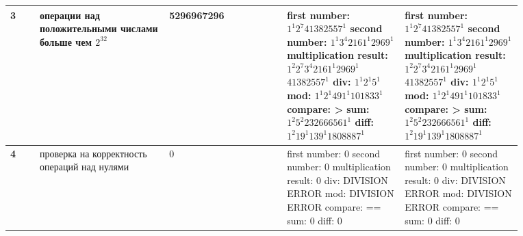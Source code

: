 \begin{table}[htbp]
\begin{tabular}{|p{0.05\linewidth}|p{0.22\linewidth}|p{0.2\linewidth}|p{0.2\linewidth}|p{0.2\linewidth}|}
		\textbf{3} 
		& операции над положительными числами больше чем $2^{32}$
		& 5296967296 \newline 519696729
		& first number: $1^1 2^7 41382557^1$ \newline
		second number: $1^1 3^4 2161^1 2969^1$ \newline
		multiplication result: $1^2 2^7 3^4 2161^1 2969^1$ \newline $41382557^1$ \newline
		div: $1^1 2^1 5^1$ \newline
		mod: $1^1 2^1 491^1 101833^1$ \newline
		compare: > \newline
		sum: $1^2 5^2 232666561^1$ \newline
		diff: $1^2 19^1 139^1 1808887^1$
		& first number: $1^1 2^7 41382557^1$ \newline
		second number: $1^1 3^4 2161^1 2969^1$ \newline
		multiplication result: $1^2 2^7 3^4 2161^1 2969^1$ \newline $41382557^1$ \newline
		div: $1^1 2^1 5^1$ \newline
		mod: $1^1 2^1 491^1 101833^1$ \newline
		compare: > \newline
		sum: $1^2 5^2 232666561^1$ \newline
		diff: $1^2 19^1 139^1 1808887^1$ \\
		\hline
		
		\textbf{4}
		& проверка на корректность операций над нулями
		& 0\newline 0 
		& first number: 0 \newline
		second number: 0 \newline
		multiplication result: 0 \newline
 		div: DIVISION ERROR \newline
		mod: DIVISION ERROR \newline
		compare: == \newline
		sum: 0 
				diff: 0 
		& first number: 0 \newline
		second number: 0 \newline
		multiplication result: 0 \newline
		div: DIVISION ERROR \newline
		mod: DIVISION ERROR \newline
		compare: == \newline
		sum: 0
		diff: 0  \\
		\hline
	\end{tabular}
	\label{tab:tests1}
\end{table}
